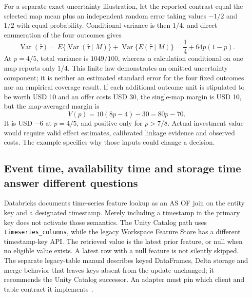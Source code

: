 For a separate exact uncertainty illustration, let the reported contrast equal
the selected map mean plus an independent random error taking values $-1/2$ and
$1/2$ with equal probability. Conditional variance is then $1/4$, and direct
enumeration of the four outcomes gives
\begin{equation}
 \operatorname{Var}(\widehat\tau)
 =E\{\operatorname{Var}(\widehat\tau\mid M)\}
  +\operatorname{Var}\{E(\widehat\tau\mid M)\}
 =\frac14+64p(1-p).
 \label{exec22:obs-variance}
\end{equation}
At $p=4/5$, total variance is $1049/100$, whereas a calculation conditional on one
map reports only $1/4$. This finite law demonstrates an omitted uncertainty
component; it is neither an estimated standard error for the four fixed outcomes
nor an empirical coverage result. If each additional outcome unit is stipulated
to be worth USD 10 and an offer costs USD 30, the single-map margin is USD 10,
but the map-averaged margin is
\begin{equation}
 V(p)=10(8p-4)-30=80p-70.
 \label{exec22:obs-value}
\end{equation}
It is USD $-6$ at $p=4/5$, and positive only for $p>7/8$. Actual investment value
would require valid effect estimates, calibrated linkage evidence and observed
costs. The example specifies why those inputs could change a decision.

\subsection{Event time, availability time and storage time answer different questions}
\label{exec22:obs-clocks}

Databricks documents time-series feature lookup as an AS OF join on the entity
key and a designated timestamp. Merely including a timestamp in the primary key
does not activate those semantics. The Unity Catalog path uses
\texttt{timeseries\_columns}, while the legacy Workspace Feature Store has a
different timestamp-key API. The retrieved value is the latest prior feature,
or null when no eligible value exists. A latest row with a null feature is not
silently skipped. The separate legacy-table manual describes keyed DataFrames,
Delta storage and merge behavior that leaves keys absent from the update
unchanged; it recommends the Unity Catalog successor. An adapter must pin which
client and table contract it implements~\citep{exec22_obs_databricks_pit,exec22_obs_databricks_feature}.

